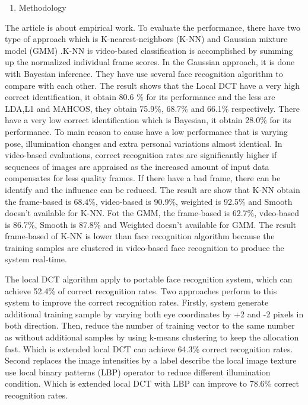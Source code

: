\documentclass[a4paper,12pt]{article}
\begin{document}
\maketitle
\begin{enumerate}[{4.}]\bfseries
\item{\normalsize Methodology} 
\end{enumerate}

The article is about empirical work. To evaluate the performance, there have two type of approach which is K-nearest-neighbors (K-NN) and Gaussian mixture model (GMM) .K-NN is video-based classification is accomplished by summing up the normalized individual frame scores. In the Gaussian approach, it is done with Bayesian inference.  They have use several face recognition algorithm to compare with each other. The result shows that the Local DCT have a very high correct identification, it obtain 80.6 \% for its performance and the less are LDA,L1 and MAHCOS, they obtain 75.9\%, 68.7\% and 66.1\% respectively. There have a very low correct identification which is Bayesian, it obtain 28.0\% for its performance. To main reason to cause have a low performance that is varying pose, illumination changes and extra personal variations almost identical.
In video-based evaluations, correct recognition rates are significantly higher if sequences of images are appraised as the increased amount of input data compensates for less quality frames. If there have a bad frame, there can be identify and the influence can be reduced. The result are show that K-NN obtain the frame-based is 68.4\%, video-based is 90.9\%, weighted is 92.5\% and Smooth doesn’t available for K-NN. Fot the GMM, the frame-based is 62.7\%, vdeo-based is 86.7\%, Smooth is 87.8\% and Weighted doesn’t available for GMM. The result frame-based of K-NN is lower than face recognition algorithm because the training samples are clustered in video-based face recognition to produce the system real-time. 

The local DCT algorithm apply to portable face recognition system, which can achieve 52.4\% of correct recognition rates. Two approaches perform to this system to improve the correct recognition rates. Firstly, system generate additional training sample by varying both eye coordinates by +2 and -2 pixels in both direction. Then, reduce the number of training vector to the same number as without additional samples by using k-means clustering to keep the allocation fast. Which is extended local DCT can achieve 64.3\% correct recognition rates. Second replaces the image intensities by a label describe the local image texture use local binary patterns (LBP) operator to reduce different illumination condition. Which is extended local DCT with LBP can improve to 78.6\% correct recognition rates. 
\end{document}

